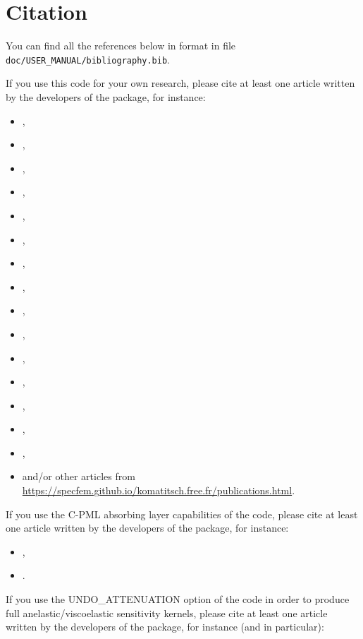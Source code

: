 \section{Citation}

You can find all the references below in \BibTeX format in file \texttt{doc/USER\_MANUAL/bibliography.bib}.\newline

If you use this code for your own research, please cite at least one article
written by the developers of the package, for instance:
%
\begin{itemize}
\item \cite{TrKoLi08},
\item \cite{PeKoLuMaLeCaLeMaLiBlNiBaTr11},
\item \cite{VaCaSaKoVi99},
\item \cite{LeChKoHuTr09},
\item \cite{LeChLiKoHuTr08},
\item \cite{LeKoHuTr09},
\item \cite{KoErGoMi10},
\item \cite{KoMiEr09},
\item \cite{LiPoKoTr04},
\item \cite{ChKoViCaVaFe07},
\item \cite{KoVi98},
\item \cite{KoTr99},
\item \cite{KoLiTrSuStSh04},
\item \cite{MoTr08},
\item \cite{BlKoChLoXi16},
\item and/or other articles from \url{https://specfem.github.io/komatitsch.free.fr/publications.html}.
\end{itemize}
%
If you use the C-PML absorbing layer capabilities of the code, please cite at least one article
written by the developers of the package, for instance:
%
\begin{itemize}
\item \cite{XiKoMaMa14},
\item \cite{XiMaCrKoMa16}.
\end{itemize}
%
If you use the UNDO\_ATTENUATION option of the code in order to produce full anelastic/viscoelastic sensitivity kernels, please cite at least one article
written by the developers of the package, for instance (and in particular):
